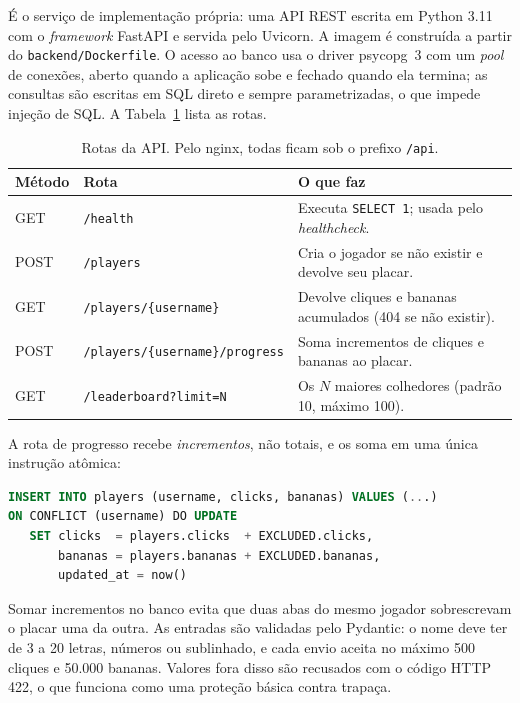 \documentclass[12pt]{article}
\begin{document}
É o serviço de implementação própria: uma API REST \cite{fielding} escrita
em Python 3.11 com o \emph{framework} FastAPI \cite{fastapi} e servida pelo
Uvicorn. A imagem é construída a partir do \texttt{backend/Dockerfile}. O
acesso ao banco usa o driver psycopg~3 \cite{psycopg} com um
\emph{pool} de conexões, aberto quando a aplicação sobe e fechado quando
ela termina; as consultas são escritas em SQL direto e sempre
parametrizadas, o que impede injeção de SQL. A Tabela~\ref{tab:rotas}
lista as rotas.

\begin{table}[ht]
\centering
\caption{Rotas da API. Pelo nginx, todas ficam sob o prefixo \texttt{/api}.}
\label{tab:rotas}
\small
\begin{tabularx}{\linewidth}{@{}l l X@{}}
\toprule
Método & Rota & O que faz \\
\midrule
GET  & \texttt{/health} & Executa \texttt{SELECT 1}; usada pelo \emph{healthcheck}. \\
POST & \texttt{/players} & Cria o jogador se não existir e devolve seu placar. \\
GET  & \texttt{/players/\{username\}} & Devolve cliques e bananas acumulados (404 se não existir). \\
POST & \texttt{/players/\{username\}/progress} & Soma incrementos de cliques e bananas ao placar. \\
GET  & \texttt{/leaderboard?limit=N} & Os $N$ maiores colhedores (padrão 10, máximo 100). \\
\bottomrule
\end{tabularx}
\end{table}

A rota de progresso recebe \emph{incrementos}, não totais, e os soma em
uma única instrução atômica:

\begin{lstlisting}[language=SQL]
INSERT INTO players (username, clicks, bananas) VALUES (...)
ON CONFLICT (username) DO UPDATE
   SET clicks  = players.clicks  + EXCLUDED.clicks,
       bananas = players.bananas + EXCLUDED.bananas,
       updated_at = now()
\end{lstlisting}

Somar incrementos no banco evita que duas abas do mesmo jogador
sobrescrevam o placar uma da outra. As entradas são validadas pelo
Pydantic: o nome deve ter de 3 a 20 letras, números ou sublinhado, e cada
envio aceita no máximo 500 cliques e 50.000 bananas. Valores fora disso
são recusados com o código HTTP 422, o que funciona como uma proteção
básica contra trapaça.
\end{document}
